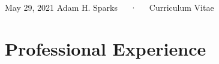 \documentclass[11pt, a4paper]{awesome-cv}
\begin{document}
\makecvheader

\makecvfooter
  {May 29, 2021}
    {Adam H. Sparks~~~·~~~Curriculum Vitae}
  {\thepage}





\hypertarget{professional-experience}{%
\section{Professional Experience}\label{professional-experience}}
\end{document}
